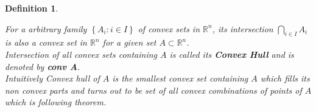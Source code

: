 \documentclass[oneside]{book}
\newtheorem{mydef}{Definition}
\begin{document}
\begin{mydef}  \label{d:4}


For a arbitrary family  $\left\{A_{i}: i \in I\right\}$ of convex sets in   $\mathbb{R}^{n}$, its intersection $\bigcap_{i \in I} A_{i}$ is also a convex set in $\mathbb{R}^{n}$  for a given set $A \subset \mathbb{R}^{n}$.\\ Intersection of all convex sets containing $A$ is called its  \textbf{Convex Hull} and is denoted by  \textbf{conv A}.\\
 Intuitively Convex hull of $A$  is the smallest convex set containing $A$ which fills its non convex parts and turns out to be set of all convex combinations of points of $A$ which is following theorem.
 
 \end{mydef}
 
 
\end{document}
